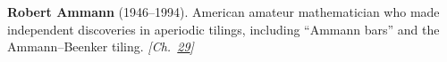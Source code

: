 \textbf{Robert Ammann} (1946–1994). American amateur mathematician who made independent discoveries in aperiodic tilings, including ``Ammann bars'' and the Ammann–Beenker tiling. \emph{[Ch.~\hyperref[ch:hatmonotile]{29}]}

